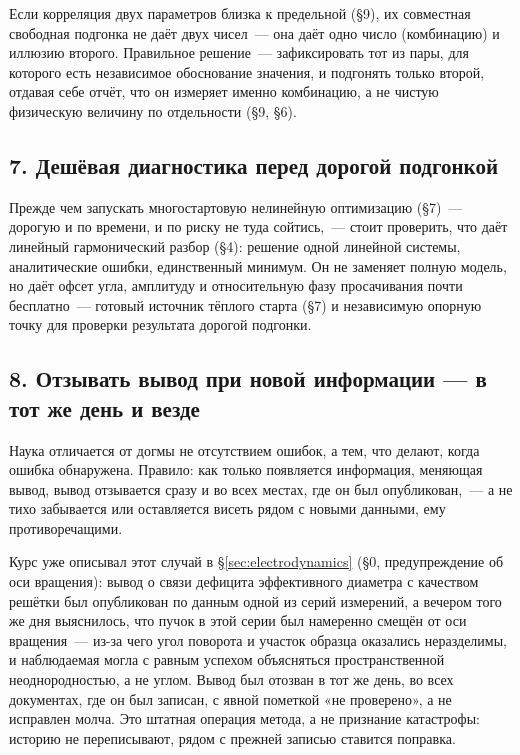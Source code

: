 Если корреляция двух параметров близка к предельной (§9), их совместная свободная подгонка не
даёт двух чисел~--- она даёт одно число (комбинацию) и иллюзию второго. Правильное решение~---
зафиксировать тот из пары, для которого есть независимое обоснование значения, и подгонять только
второй, отдавая себе отчёт, что он измеряет именно комбинацию, а не чистую физическую величину
по отдельности (§9, §6).

\subsection{7. Дешёвая диагностика перед дорогой подгонкой}
\label{subsec:rule7}

Прежде чем запускать многостартовую нелинейную оптимизацию (§7)~--- дорогую и по времени, и по
риску не туда сойтись,~--- стоит проверить, что даёт линейный гармонический разбор (§4): решение
одной линейной системы, аналитические ошибки, единственный минимум. Он не заменяет полную модель,
но даёт офсет угла, амплитуду и относительную фазу просачивания почти бесплатно~--- готовый
источник тёплого старта (§7) и независимую опорную точку для проверки результата дорогой
подгонки.

\subsection{8. Отзывать вывод при новой информации — в тот же день и везде}
\label{subsec:rule8}

Наука отличается от догмы не отсутствием ошибок, а тем, что делают, когда ошибка обнаружена.
Правило: как только появляется информация, меняющая вывод, вывод отзывается сразу и во всех
местах, где он был опубликован,~--- а не тихо забывается или оставляется висеть рядом с новыми
данными, ему противоречащими.

\begin{example}
Курс уже описывал этот случай в §\ref{sec:electrodynamics} (§0, предупреждение об оси вращения):
вывод о связи дефицита эффективного диаметра с качеством решётки был опубликован по данным одной
из серий измерений, а вечером того же дня выяснилось, что пучок в этой серии был намеренно смещён
от оси вращения~--- из-за чего угол поворота и участок образца оказались неразделимы, и наблюдаемая
могла с равным успехом объясняться пространственной неоднородностью, а не углом. Вывод был отозван
в тот же день, во всех документах, где он был записан, с явной пометкой «не проверено», а не
исправлен молча. Это штатная операция метода, а не признание катастрофы: историю не переписывают,
рядом с прежней записью ставится поправка.
\end{example}

